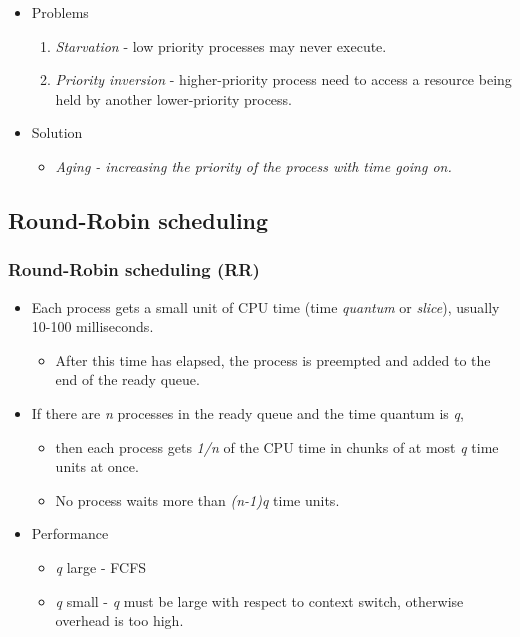 \documentclass[CJKutf8,dvipsnames,table]{beamer}
\begin{document}
\begin{CJK*}{UTF8}{song}
\begin{frame}
\begin{itemize}
  \item Problems  \pause
    \begin{enumerate}
    \item \emph{Starvation} \pause - low priority processes may never execute.  \pause
    \item \emph{Priority inversion} \pause - higher-priority process need to access a resource being held by another lower-priority process.  \pause
    \end{enumerate}
  \item Solution  \pause
    \begin{itemize}
    \item \emph{Aging  \pause - increasing the priority of the process with
      time going on.}
    \end{itemize}
  \end{itemize}
  \end{frame}
  
  \subsection{Round-Robin scheduling}

  \begin{frame}
  \frametitle{Round-Robin scheduling (RR)} \pause
  \begin{itemize}
  \item Each process gets a small unit of CPU time (time \emph{quantum} or \emph{slice}), usually 10-100 milliseconds.  \pause
    \begin{itemize}
    \item After this time has elapsed, the process is preempted and added to the end of the ready queue.  \pause
    \end{itemize}
  \item If there are \textit{n} processes in the ready queue and the time quantum is \textit{q},  \pause
    \begin{itemize}
    \item then each process gets \textit{1/n} of the CPU time in chunks of at most \textit{q} time units at once.  \pause
    \item No process waits more than \textit{(n-1)q} time units.  \pause
    \end{itemize}
  \item Performance  \pause
    \begin{itemize}
    \item \textit{q} large \pause - FCFS  \pause
    \item \textit{q} small \pause - \textit{q} must be large with respect to context switch, otherwise overhead is too high. 
    \end{itemize}
  \end{itemize}
  \end{frame}
  

\end{CJK*}
\end{document}
